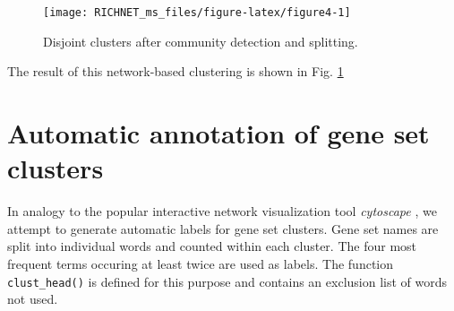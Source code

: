 \documentclass[9pt,a4paper,]{extarticle}
\begin{document}
\begin{figure}

{\centering \texttt{[image: RICHNET\_ms\_files/figure-latex/figure4-1]} 

}

\caption{Disjoint clusters after community detection and splitting.}\label{fig:figure4}
\end{figure}

The result of this network-based clustering is shown in Fig. \ref{fig:figure4}

\newpage

\section{Automatic annotation of gene set clusters}\label{automatic-annotation-of-gene-set-clusters}

In analogy to the popular interactive network visualization tool \emph{cytoscape} \citep{Kucera2016}, we attempt to generate automatic labels for gene set clusters. Gene set names are split into individual words and counted within each cluster. The four most frequent terms occuring at least twice are used as labels. The function \texttt{clust\_head()} is defined for this purpose and contains an exclusion list of words not used.
\end{document}
